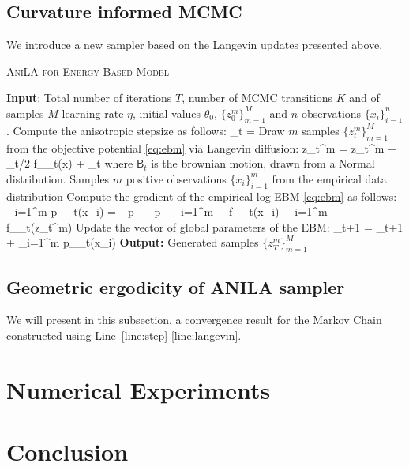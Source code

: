 \documentclass{article}
\begin{document}
\subsection{Curvature informed MCMC}

We introduce a new sampler based on the Langevin updates presented above.

\begin{algorithm}[H]
\caption{\textsc{AniLA for Energy-Based Model}} \label{alg:ldams}
\begin{algorithmic}[1]
\STATE \textbf{Input}: Total number of iterations $T$, number of MCMC transitions $K$ and of samples $M$ learning rate $\eta$, initial values $\theta_0$, $\{ z_{0}^m \}_{m=1}^M$ and $n$ observations $\{ x_{i} \}_{i=1}^n$.
\STATE Compute the anisotropic stepsize as follows: \label{line:step}
\beq
\stepsize_t = 
\eeq
\STATE Draw $m$ samples $\{ z_{t}^m \}_{m=1}^M$ from the objective potential \eqref{eq:ebm} via Langevin diffusion:\label{line:langevin}
\beq
z_{t}^m = z_{t}^m + \stepsize_t/2  \nabla f_{\theta_t}(x) + \sqrt{\stepsize} _t
\eeq
where $\mathsf{B}_t$ is the brownian motion, drawn from a Normal distribution.
\STATE Samples $m$ positive observations $\{ x_{i} \}_{i=1}^m$ from the empirical data distribution
\STATE Compute the gradient of the empirical log-EBM \eqref{eq:ebm} as follows:
\beq
\nabla \sum_{i=1}^m \log p_{\theta_t}(x_i) = _{p_{}}-_{p_{\theta}} \approx {} \sum_{i=1}^{m} \nabla_{\theta} f_{\theta_t}\left(x_{i}\right)- \sum_{i=1}^{m} \nabla_{\theta} f_{\theta_t}\left(z_t^m\right)
\eeq
\STATE Update the vector of global parameters of the EBM:
\beq
\theta_{t+1} = \theta_{t+1} + \eta \nabla \sum_{i=1}^m \log p_{\theta_t}(x_i)
\eeq
\ENDFOR
\STATE \textbf{Output:} Generated samples $\{ z_{T}^m \}_{m=1}^M$
\end{algorithmic}
\end{algorithm}



\subsection{Geometric ergodicity of ANILA sampler}
We will present in this subsection, a convergence result for the Markov Chain constructed using Line~\ref{line:step}-\ref{line:langevin}. 


\section{Numerical Experiments}


\section{Conclusion}

\newpage






\end{document}
